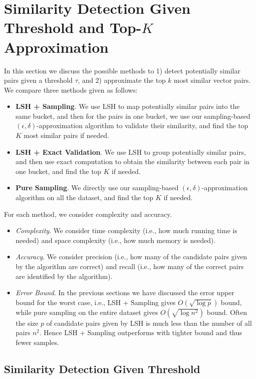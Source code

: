 \documentclass{article}
\begin{document}
\section{Similarity Detection Given Threshold and Top-$K$ Approximation}
In this section we discuss the possible methods to 1) detect potentially similar pairs given a threshold $\tau$, and 2) approximate the top $k$ most similar vector pairs. We compare three methods given as follows:
\begin{itemize}
\item {\bf LSH + Sampling}. We use LSH to map potentially similar pairs into the same bucket, and then for the pairs in one bucket, we use our sampling-based $(\epsilon, \delta)$-approximation algorithm to validate their similarity, and find the top $K$ most similar pairs if needed.
\item {\bf LSH + Exact Validation}. We use LSH to group potentially similar pairs, and then use exact computation to obtain the similarity between each pair in one bucket, and find the top $K$ if needed.
\item {\bf Pure Sampling}. We directly use our sampling-based $(\epsilon, \delta)$-approximation algorithm on all the dataset, and find the top $K$ if needed.
\end{itemize}
For each method, we consider complexity and accuracy.
\begin{itemize}
\item \emph{Complexity}. We consider time complexity (i.e., how much running time is needed) and space complexity (i.e., how much memory is needed).
\item \emph{Accuracy}. We consider precision (i.e., how many of the candidate pairs given by the algorithm are correct) and recall (i.e., how many of the correct pairs are identified by the algorithm). 
\item \emph{Error Bound}. In the previous sections we have discussed the error upper bound for the worst case, i.e., LSH + Sampling gives $O(\sqrt{\log p})$ bound, while pure sampling on the entire dataset gives $O(\sqrt{\log n^2})$ bound. Often the size $p$ of candidate pairs given by LSH is much less than the number of all pairs $n^2$. Hence LSH + Sampling outperforms with tighter bound and thus fewer samples.
\end{itemize}

\subsection{Similarity Detection Given Threshold}
\end{document}
